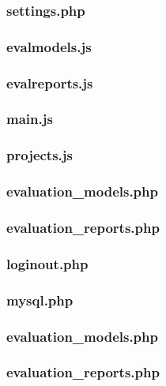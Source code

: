 \documentclass[12pt,a4paper,spanish,twoside]{article}
\begin{document}
\subsubsection{settings.php}

\subsubsection{evalmodels.js}

\subsubsection{evalreports.js}

\subsubsection{main.js}

\subsubsection{projects.js}


\subsubsection{evaluation\_models.php}

\subsubsection{evaluation\_reports.php}

\subsubsection{loginout.php}

\subsubsection{mysql.php}


\subsubsection{evaluation\_models.php}

\subsubsection{evaluation\_reports.php}

\end{document}
